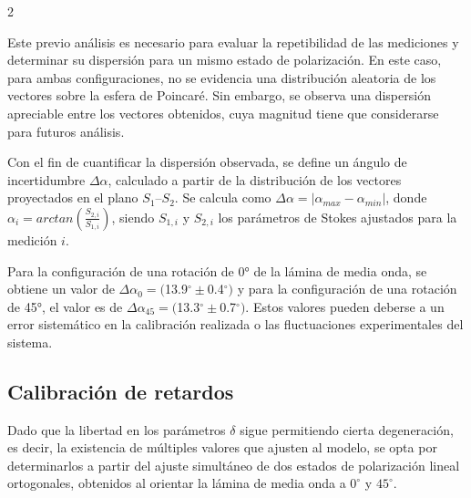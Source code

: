 \documentclass[11pt,a4paper]{article}
\begin{document}
\begin{multicols}{2}

Este previo análisis es necesario para evaluar la repetibilidad de las mediciones y determinar su dispersión para un mismo estado de polarización. En este caso, para ambas configuraciones, no se evidencia una distribución aleatoria de los vectores sobre la esfera de Poincaré. Sin embargo, se observa una dispersión apreciable entre los vectores obtenidos, cuya magnitud tiene que considerarse para futuros análisis. 

Con el fin de cuantificar la dispersión observada, se define un ángulo de incertidumbre $\Delta\alpha$, calculado a partir de la distribución de los vectores proyectados en el plano $S_1$--$S_2$. Se calcula como $\Delta\alpha=|\alpha_{max} - \alpha_{min}|$, donde $\alpha_i=arctan\left(\frac{S_{2,i}}{S_{1,i}}\right)$, siendo $S_{1,i}$ y $S_{2,i}$ los parámetros de Stokes ajustados para la medición $i$. 

Para la configuración de una rotación de 0° de la lámina de media onda, se obtiene un valor de $\Delta\alpha_0=($13.9$^\circ \pm $0.4$^\circ)$ y para la configuración de una rotación de 45°, el valor es de $\Delta\alpha_{45}=($13.3$^\circ \pm $0.7$^\circ)$. Estos valores pueden deberse a un error sistemático en la calibración realizada o las fluctuaciones experimentales del sistema.


\subsection{Calibración de retardos}

Dado que la libertad en los parámetros $\delta$ sigue permitiendo cierta degeneración, es decir, la existencia de múltiples valores que ajusten al modelo, se opta por determinarlos a partir del ajuste simultáneo de dos estados de polarización lineal ortogonales, obtenidos al orientar la lámina de media onda a $0^\circ$ y $45^\circ$. 


\end{multicols}
\end{document}
